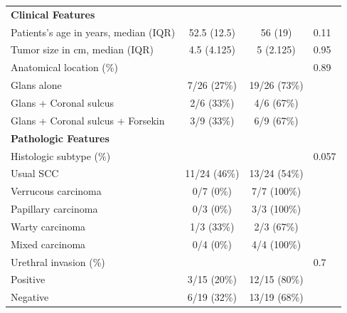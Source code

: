 \documentclass[11pt,letterpaper]{article}\usepackage[]{graphicx}\usepackage[]{color}
\begin{document}
\begin{multicols}{2}
\begin{table}
\begin{tabular}{lccl}
\textbf{Clinical Features} & ~ & ~ & ~ \\
\hspace{2ex} Patients's age in years, median (IQR)
        & 52.5 (12.5)
        & 56 (19)
        & 0.11 \\
\hspace{2ex} Tumor size in cm, median (IQR)
        & 4.5 (4.125)
        & 5 (2.125)
        & 0.95 \\
\hspace{2ex} Anatomical location (\%) & ~ & ~ & 0.89 \\
\hspace{4ex} Glans alone
        & 7/26 (27\%)
        & 19/26 (73\%)
        & ~ \\
\hspace{4ex} Glans + Coronal sulcus
        & 2/6 (33\%)
        & 4/6 (67\%)
        & ~ \\
\hspace{4ex} Glans + Coronal sulcus + Forsekin
        & 3/9 (33\%)
        & 6/9 (67\%)
        & ~ \\

\textbf{Pathologic Features} & ~ & ~ & ~ \\
\hspace{2ex} Histologic subtype (\%) & ~ & ~ & 0.057 \\
\hspace{4ex} Usual SCC
        & 11/24 (46\%)
        & 13/24 (54\%)
        & ~ \\
\hspace{4ex} Verrucous carcinoma
        & 0/7 (0\%)
        & 7/7 (100\%)
        & ~ \\
\hspace{4ex} Papillary carcinoma
        & 0/3 (0\%)
        & 3/3 (100\%)
        & ~ \\
\hspace{4ex} Warty carcinoma
        & 1/3 (33\%)
        & 2/3 (67\%)
        & ~ \\
\hspace{4ex} Mixed carcinoma
        & 0/4 (0\%)
        & 4/4 (100\%)
        & ~ \\

\hspace{2ex} Urethral invasion (\%) & ~ & ~ & 0.7 \\
\hspace{4ex} Positive
        & 3/15 (20\%)
        & 12/15 (80\%)
        & ~ \\
\hspace{4ex} Negative
        & 6/19 (32\%)
        & 13/19 (68\%)
        & ~ \\


\end{tabular}
\end{table}
\end{multicols}
\end{document}
